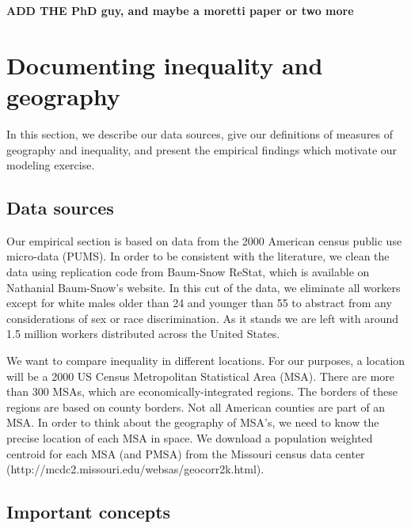\documentclass{article}
\begin{document}
\textbf{ADD THE PhD guy, and maybe a moretti paper or two more}

\section{Documenting inequality and geography}

In this section, we describe our data sources, give our definitions of measures of geography and inequality, and present the empirical findings which motivate our modeling exercise.  
\subsection{Data sources}

Our empirical section is based on data from the 2000 American census public use micro-data (PUMS).  In order to be consistent with the literature, we clean the data using replication code from Baum-Snow ReStat, which is available on Nathanial Baum-Snow's website.  In this cut of the data, we eliminate all workers except for white males older than 24 and younger than 55 to abstract from any considerations of sex or race discrimination.  As it stands we are left with around 1.5 million workers distributed across the United States.

We want to compare inequality in different locations.  For our purposes, a location will be a 2000 US Census Metropolitan Statistical Area (MSA).  There are more than 300 MSAs, which are economically-integrated regions.  The borders of these regions are based on county borders.  Not all American counties are part of an MSA.  In order to think about the geography of MSA's, we need to know the precise location of each MSA in space.  We download a population weighted centroid for each MSA (and PMSA) from the Missouri census data center (http://mcdc2.missouri.edu/websas/geocorr2k.html).

\subsection{Important concepts}
\end{document}
